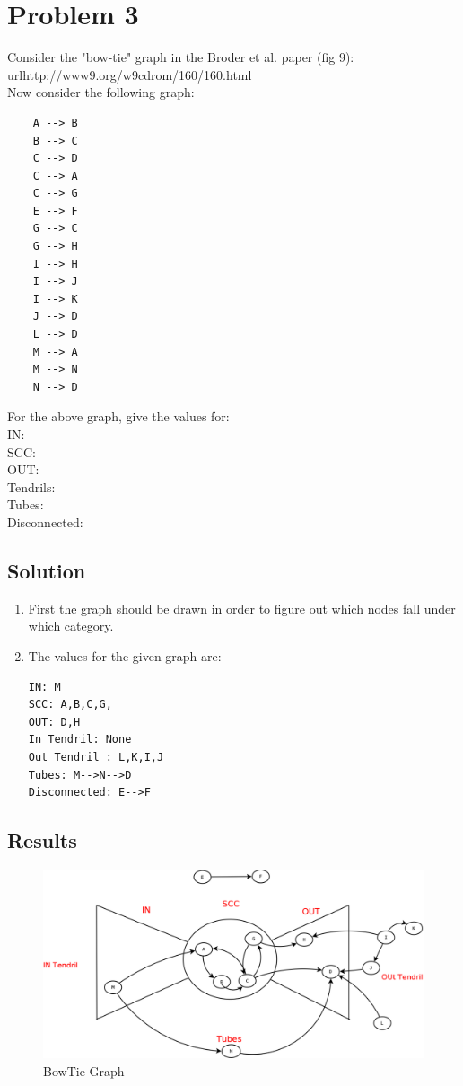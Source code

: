 

\section{Problem 3}
\label{part3}
Consider the "bow-tie" graph in the Broder et al. paper (fig 9):
url{http://www9.org/w9cdrom/160/160.html}\\


\noindent Now consider the following graph:
    \begin{verbatim}
    A --> B
    B --> C
    C --> D
    C --> A
    C --> G
    E --> F
    G --> C
    G --> H
    I --> H
    I --> J
    I --> K
    J --> D
    L --> D
    M --> A
    M --> N
    N --> D
     \end{verbatim}
    For the above graph, give the values for:\\
IN: \\
SCC: \\
OUT: \\
Tendrils: \\
Tubes: \\
Disconnected:

\subsection{Solution}
\begin{enumerate}
\item First the graph should be drawn in order to figure out which nodes fall under which category. 
\item The values for the given graph are:
\begin{verbatim}
IN: M
SCC: A,B,C,G,
OUT: D,H
In Tendril: None
Out Tendril : L,K,I,J
Tubes: M-->N-->D
Disconnected: E-->F
\end{verbatim}

\end{enumerate}

\newpage
\subsection{Results}
\begin{figure}[ht]    
    \begin{center}
        \includegraphics[scale=0.30]{part3.png}
        \caption{BowTie Graph}
        \label{fig:X-distribution}
    \end{center}
\end{figure}
